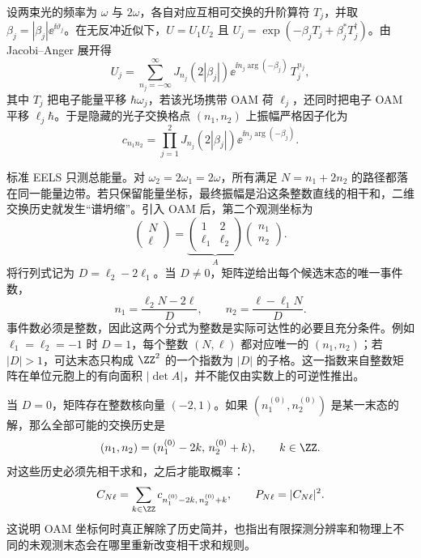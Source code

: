 设两束光的频率为 $\omega$ 与 $2\omega$，各自对应互相可交换的升阶算符 $T_j$，并取 $\beta_j=|\beta_j|\ee^{\ii\vartheta_j}$。在无反冲近似下，$U=U_1U_2$ 且 $U_j=\exp(-\beta_jT_j+\beta_j^*T_j^\dagger)$。由 Jacobi--Anger 展开得
\begin{equation}
U_j=\sum_{n_j=-\infty}^{\infty}J_{n_j}(2|\beta_j|)\ee^{\ii n_j\arg(-\beta_j)}\,T_j^{n_j},
\end{equation}
其中 $T_j$ 把电子能量平移 $\hbar\omega_j$，若该光场携带 OAM 荷 $\ell_j$，还同时把电子 OAM 平移 $\ell_j\hbar$。于是隐藏的光子交换格点 $(n_1,n_2)$ 上振幅严格因子化为
\begin{equation}
c_{n_1n_2}=\prod_{j=1}^{2}J_{n_j}(2|\beta_j|)\ee^{\ii n_j\arg(-\beta_j)}.
\label{eq:ch03-li-coeff}
\end{equation}

标准 EELS 只测总能量。对 $\omega_2=2\omega_1=2\omega$，所有满足 $N=n_1+2n_2$ 的路径都落在同一能量边带。若只保留能量坐标，最终振幅是沿这条整数直线的相干和，二维交换历史就发生“谱坍缩”。引入 OAM 后，第二个观测坐标为
\begin{equation}
\begin{pmatrix}N\\ \ell\end{pmatrix}
=\underbrace{\begin{pmatrix}1&2\\ \ell_1&\ell_2\end{pmatrix}}_{A}
\begin{pmatrix}n_1\\n_2\end{pmatrix}.
\label{eq:ch03-li-map}
\end{equation}
将行列式记为 $D=\ell_2-2\ell_1$。当 $D\neq0$，矩阵逆给出每个候选末态的唯一事件数，
\begin{equation}
 n_1=\frac{\ell_2N-2\ell}{D},\qquad
 n_2=\frac{\ell-\ell_1N}{D}.
 \label{eq:oam-integer-inverse}
\end{equation}
事件数必须是整数，因此这两个分式为整数是实际可达性的必要且充分条件。例如 $\ell_1=\ell_2=-1$ 时 $D=1$，每个整数 $(N,\ell)$ 都对应唯一的 $(n_1,n_2)$；若 $|D|>1$，可达末态只构成 $\ZZ^2$ 的一个指数为 $|D|$ 的子格。这一指数来自整数矩阵在单位元胞上的有向面积 $|\det A|$，并不能仅由实数上的可逆性推出。

当 $D=0$，矩阵存在整数核向量 $(-2,1)$。如果 $(n_1^{(0)},n_2^{(0)})$ 是某一末态的解，那么全部可能的交换历史是
\begin{equation}
 (n_1,n_2)=(n_1^{(0)}-2k,\,n_2^{(0)}+k),\qquad k\in\ZZ.
 \label{eq:oam-degenerate-histories}
\end{equation}
对这些历史必须先相干求和，之后才能取概率：
\begin{equation}
 C_{N\ell}=\sum_{k\in\ZZ}c_{n_1^{(0)}-2k,\,n_2^{(0)}+k},\qquad
 P_{N\ell}=|C_{N\ell}|^2.
 \label{eq:oam-degenerate-amplitude}
\end{equation}
这说明 OAM 坐标何时真正解除了历史简并，也指出有限探测分辨率和物理上不同的未观测末态会在哪里重新改变相干求和规则。


